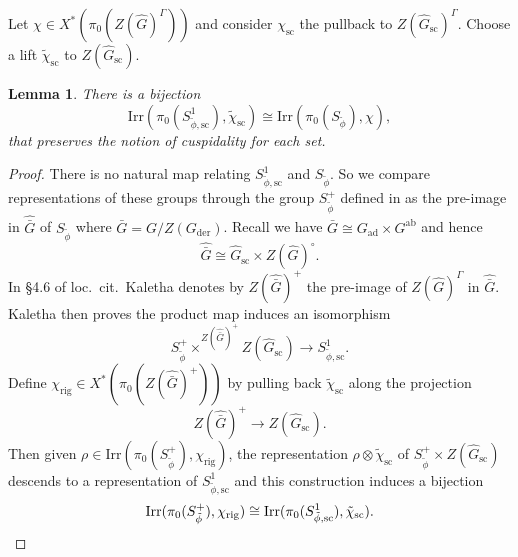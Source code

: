 \documentclass{amsart}
\newtheorem{lemma}[theorem]{Lemma}
\theoremstyle{definition}
\theoremstyle{remark}
\numberwithin{equation}{section}
\newcommand{\der}{\mathrm{der}}
\newcommand{\Sc}{\mathrm{sc}}
\newcommand{\ad}{\mathrm{ad}}
\newcommand{\Irr}{\mathrm{Irr}}
\newcommand{\ab}{\mathrm{ab}}
\newcommand{\wh}{\widehat}
\newcommand{\rig}{\mathrm{rig}}
\begin{document}
Let $\chi \in X^{\ast}(\pi_0(Z(\wh{G})^{\Gamma}))$ and consider $\chi_{\Sc}$ the pullback to $Z(\wh{G}_{\Sc})^{\Gamma}$. Choose a lift $\tilde{\chi}_{\Sc}$ to $Z(\wh{G}_{\Sc})$.
\begin{lemma}
    There is a bijection
    \begin{equation*}
        \Irr(\pi_0(S^1_{\tilde{\phi}, \Sc}), \tilde{\chi}_{\Sc}) \cong \Irr(\pi_0(S_{\tilde{\phi}}), \chi),
    \end{equation*}
    that preserves the notion of cuspidality for each set.
\end{lemma}
\begin{proof}
There is no natural map relating $S^1_{\tilde{\phi}, \Sc}$ and $S_{\tilde{\phi}}$. So we compare representations of these groups through the group $S^+_{\tilde{\phi}}$ defined in \cite[\S4.2]{KalethaLLCnonQS} as the pre-image in $\wh{\bar{G}}$ of $S_{\tilde{\phi}}$ where $\bar{G} = G/Z(G_{\der})$. Recall we have $\bar{G} \cong G_{\ad} \times G^{\ab}$ and hence 
\begin{equation*}
    \wh{\bar{G}} \cong \wh{G}_{\Sc} \times Z(\wh{G})^{\circ}.
\end{equation*}
In \S 4.6 of loc.~cit.~Kaletha denotes by $Z(\wh{\bar{G}})^+$ the pre-image of $Z(\wh{G})^{\Gamma}$ in $\wh{\bar{G}}$. Kaletha then proves the product map induces an isomorphism
\begin{equation*}
    S^+_{\tilde{\phi}} \times^{Z(\wh{\bar{G}})^+} Z(\wh{G}_{\Sc}) \rightarrow S^1_{\tilde{\phi}, \Sc}.
\end{equation*}
Define $\chi_{\rig} \in X^{\ast}(\pi_0(Z(\wh{\bar{G}})^+))$ by pulling back $\tilde{\chi}_{\Sc}$ along the projection 
\begin{equation*}
    Z(\wh{\bar{G}})^+ \rightarrow Z(\wh{G}_{\Sc}).
\end{equation*}
Then given $\rho \in \Irr(\pi_0(S^+_{\tilde{\phi}}), \chi_{\rig})$, the representation $\rho \otimes \tilde{\chi}_{\Sc}$ of $S^+_{\tilde{\phi}} \times Z(\wh{G}_{\Sc})$ descends to a representation of $S^1_{\tilde{\phi}, \Sc}$ and this construction induces a bijection 
\begin{equation}{\label{eqn: Amsvsrig}}
    \Irr(\pi_0(S^+_{\tilde{\phi}}), \chi_{\rig}) \cong \Irr(\pi_0(S^1_{\tilde{\phi}, \Sc}), \tilde{\chi}_{\Sc}).
\end{equation}


\end{proof}
\end{document}
